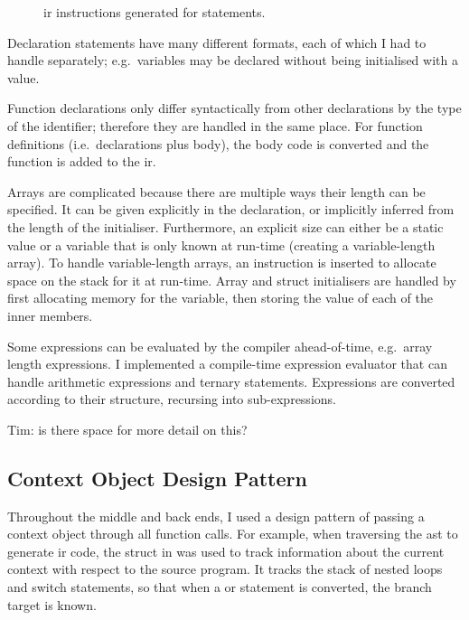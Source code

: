 \documentclass[00-main.tex]{subfiles}
\begin{document}
\begin{figure}[t]
  \centering
  \caption{\gls{ir} instructions generated for  statements.}
  \label{fig:instr structure for switch statements} %
\end{figure}

Declaration statements have many different formats, each of which I had to handle separately; e.g.~variables may be declared without being initialised with a value.

Function declarations only differ syntactically from other declarations by the type of the identifier; therefore they are handled in the same place.
For function definitions (i.e.~declarations plus body), the body code is converted and the function is added to the \gls{ir}.

Arrays are complicated because there are multiple ways their length can be specified.
It can be given explicitly in the declaration, or implicitly inferred from the length of the initialiser.
Furthermore, an explicit size can either be a static value or a variable that is only known at run-time (creating a variable-length array).
To handle variable-length arrays, an instruction is inserted to allocate space on the stack for it at run-time.
Array and struct initialisers are handled by first allocating memory for the variable, then storing the value of each of the inner members.

Some expressions can be evaluated by the compiler ahead-of-time, e.g.~array length expressions.
I implemented a compile-time expression evaluator that can handle arithmetic expressions and ternary statements.
Expressions are converted according to their structure, recursing into sub-expressions.

\begin{mrwComment}
Tim: is there space for more detail on this?
\end{mrwComment}


\subsection{Context Object Design Pattern}\label{sec:impl:context object design pattern}

Throughout the middle and back ends, I used a design pattern of passing a context object through all function calls.
For example, when traversing the \gls{ast} to generate \gls{ir} code, the  struct in  was used to track information about the current context with respect to the source program.
It tracks the stack of nested loops and switch statements, so that when a  or  statement is converted, the branch target is known.
\end{document}

